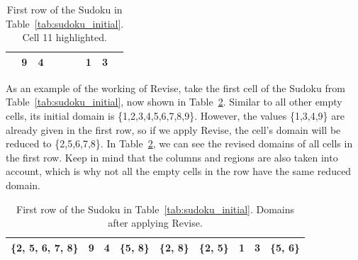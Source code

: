 \documentclass[11pt]{article} %
\begin{document}
\begin{table}[htbp]
\caption{First row of the Sudoku in Table~\ref{tab:sudoku_initial}. Cell 11 highlighted.}
    \label{tab:sudoku_frstrow}

    \begin{center}
        \begin{tabular}{|c|c|c|c|c|c|c|c|c|}
        \hline
        \cellcolor[gray]{0.7} & 9 & 4 &  &  &  & 1 & 3 & \\
        \hline
        \end{tabular}
    \end{center}
\end{table}

As an example of the working of Revise, take the first cell of the Sudoku from Table~\ref{tab:sudoku_initial}, now shown in Table~\ref{tab:sudoku_frstrow_rev}. Similar to all other empty cells, its initial domain is \{1,2,3,4,5,6,7,8,9\}.
However, the values \{1,3,4,9\} are already given in the first row, so if we apply Revise, the cell's domain will be reduced to \{2,5,6,7,8\}.
In Table~\ref{tab:sudoku_frstrow_rev}, we can see the revised domains of all cells in the first row. Keep in mind that the columns and regions are also taken into account, which is why not all the empty cells in the row have the same reduced domain.

\begin{table}[htbp]
\caption{First row of the Sudoku in Table~\ref{tab:sudoku_initial}. Domains after applying Revise.}
    \label{tab:sudoku_frstrow_rev}

    \begin{center}
        \begin{tabular}{|c|c|c|c|c|c|c|c|c|}
        \hline
        \cellcolor[gray]{0.7}\{2, 5, 6, 7, 8\} & 9 & 4 & \{5, 8\} & \{2, 8\} & \{2, 5\} & 1 & 3 & \{5, 6\}\\
        \hline
        \end{tabular}
    \end{center}
\end{table}
\end{document}
